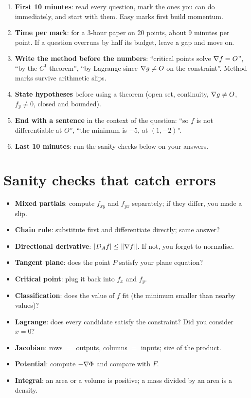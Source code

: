 \begin{method}
\begin{enumerate}
  \item \textbf{First 10 minutes}: read every question, mark the ones you can do immediately, and
  start with them. Easy marks first build momentum.
  \item \textbf{Time per mark}: for a 3-hour paper on 20 points, about 9 minutes per point. If a
  question overruns by half its budget, leave a gap and move on.
  \item \textbf{Write the method before the numbers}: ``critical points solve $\nabla f=O$'', ``by the
  $C^1$ theorem'', ``by Lagrange since $\nabla g\ne O$ on the constraint''. Method marks survive
  arithmetic slips.
  \item \textbf{State hypotheses} before using a theorem (open set, continuity, $\nabla g\ne O$,
  $f_y\ne0$, closed and bounded).
  \item \textbf{End with a sentence} in the context of the question: ``so $f$ is not differentiable
  at $O$'', ``the minimum is $-5$, at $(1,-2)$''.
  \item \textbf{Last 10 minutes}: run the sanity checks below on your answers.
\end{enumerate}
\end{method}

\section{Sanity checks that catch errors}

\begin{itemize}
  \item \textbf{Mixed partials}: compute $f_{xy}$ and $f_{yx}$ separately; if they differ, you made a slip.
  \item \textbf{Chain rule}: substitute first and differentiate directly; same answer?
  \item \textbf{Directional derivative}: $|D_Af|\le\left\lVert \nabla f\right\rVert$. If not, you forgot to normalise.
  \item \textbf{Tangent plane}: does the point $P$ satisfy your plane equation?
  \item \textbf{Critical point}: plug it back into $f_x$ and $f_y$.
  \item \textbf{Classification}: does the value of $f$ fit (the minimum smaller than nearby values)?
  \item \textbf{Lagrange}: does every candidate satisfy the constraint? Did you consider $x=0$?
  \item \textbf{Jacobian}: rows $=$ outputs, columns $=$ inputs; size of the product.
  \item \textbf{Potential}: compute $-\nabla\Phi$ and compare with $F$.
  \item \textbf{Integral}: an area or a volume is positive; a mass divided by an area is a density.
\end{itemize}

